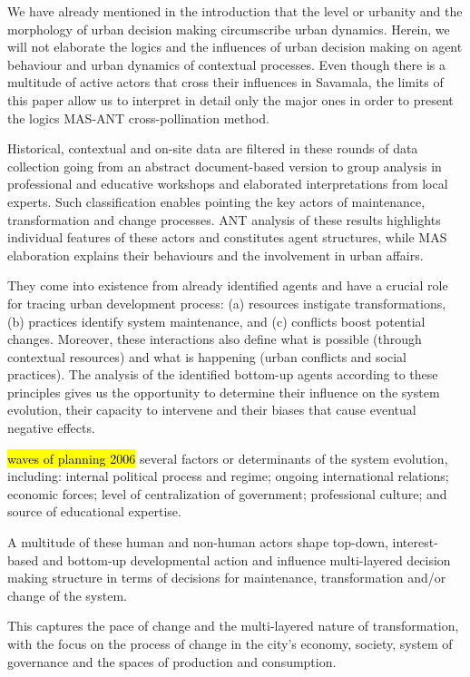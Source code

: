 \documentclass[11pt]{report}
\begin{document}
We have already mentioned in the introduction that the level or urbanity and the morphology of urban decision making circumscribe urban dynamics. Herein, we will not elaborate the logics and the influences of urban decision making on agent behaviour and urban dynamics of contextual processes.  Even though there is a multitude of active actors that cross their influences in Savamala, the limits of this paper allow us to interpret in detail only the major ones in order to present the logics MAS-ANT cross-pollination method.

Historical, contextual and on-site data are filtered in these rounds of data collection going from an abstract document-based version to group analysis in professional and educative workshops and elaborated interpretations from local experts. Such classification enables pointing the key actors of maintenance, transformation and change processes. ANT analysis of these results highlights individual features of these actors and constitutes agent structures, while MAS elaboration explains their behaviours and the involvement in urban affairs.

They come into existence from already identified agents and have a crucial role for tracing urban development process: (a) resources instigate transformations, (b) practices identify system maintenance, and (c) conflicts boost potential changes. Moreover, these interactions also define what is possible (through contextual resources) and what is happening (urban conflicts and social practices). The analysis of the identified bottom-up agents according to these principles gives us the opportunity to determine their influence on the system evolution, their capacity to intervene and their biases that cause eventual negative effects.

\hl{waves of planning 2006}
several factors or determinants of the system evolution, including: internal political process and regime; ongoing international relations; economic forces; level of centralization  of  government;  professional  culture;  and  source  of  educational  expertise.

A multitude of  these human and non-human actors shape top-down, interest-based and bottom-up developmental action and influence multi-layered decision making structure in terms of decisions  for maintenance, transformation and/or change of the system. 

This captures the pace of change and the multi-layered nature of transformation, with the focus on the process of change in the city’s economy, society, system of governance and the spaces of production and consumption.
\end{document}
